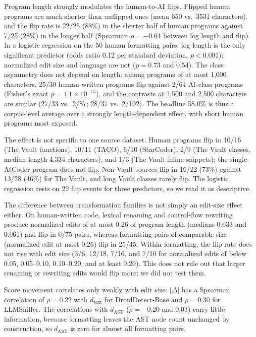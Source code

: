 \documentclass[sigconf,review,anonymous]{acmart}
\begin{document}
Program length strongly modulates the human-to-AI flips. Flipped human programs are much shorter than unflipped ones (mean 650 vs.\ 3531 characters), and the flip rate is 22/25 (88\%) in the shorter half of human programs against 7/25 (28\%) in the longer half (Spearman $\rho{=}{-}0.64$ between log length and flip). In a logistic regression on the 50 human formatting pairs, log length is the only significant predictor (odds ratio 0.12 per standard deviation, $p{<}0.001$); normalized edit size and language are not ($p{=}0.73$ and $0.54$). The class asymmetry does not depend on length: among programs of at most 1,000 characters, 25/30 human-written programs flip against 2/64 AI-class programs (Fisher's exact $p{=}1.1{\times}10^{-15}$), and the contrasts at 1,500 and 2,500 characters are similar (27/33 vs.\ 2/87; 28/37 vs.\ 2/102). The headline 58.0\% is thus a corpus-level average over a strongly length-dependent effect, with short human programs most exposed.

The effect is not specific to one source dataset. Human programs flip in 10/16 (The Vault functions), 10/11 (TACO), 6/10 (StarCoder), 2/9 (The Vault classes, median length 4,334 characters), and 1/3 (The Vault inline snippets); the single AtCoder program does not flip. Non-Vault sources flip in 16/22 (73\%) against 13/28 (46\%) for The Vault, and long Vault classes rarely flip. The logistic regression rests on 29 flip events for three predictors, so we read it as descriptive.

The difference between transformation families is not simply an edit-size effect either. On human-written code, lexical renaming and control-flow rewriting produce normalized edits of at most 0.26 of program length (medians 0.033 and 0.061) and flip in 0/75 pairs, whereas formatting pairs of comparable size (normalized edit at most 0.26) flip in 25/45. Within formatting, the flip rate does not rise with edit size (3/6, 12/18, 7/16, and 7/10 for normalized edits of below 0.05, 0.05--0.10, 0.10--0.20, and at least 0.20). This does not rule out that larger renaming or rewriting edits would flip more; we did not test them.

Score movement correlates only weakly with edit size: $|\Delta|$ has a Spearman correlation of $\rho{=}0.22$ with $d_\text{text}$ for DroidDetect-Base and $\rho{=}0.30$ for LLMSniffer. The correlations with $d_\text{AST}$ ($\rho{=}{-}0.20$ and $0.03$) carry little information, because formatting leaves the AST node count unchanged by construction, so $d_\text{AST}$ is zero for almost all formatting pairs.
\end{document}
